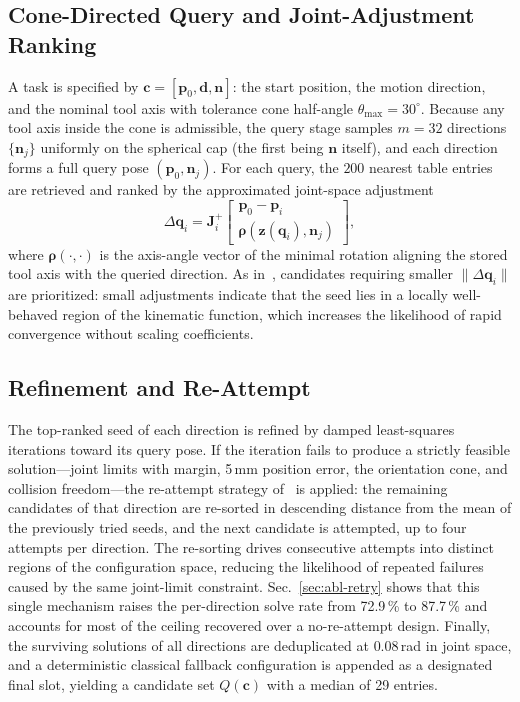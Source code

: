 \documentclass[journal]{IEEEtran}
\begin{document}
\subsection{Cone-Directed Query and Joint-Adjustment Ranking}
\label{sec:query}
A task is specified by $\mathbf{c}=[\mathbf{p}_0,\mathbf{d},\mathbf{n}]$:
the start position, the motion direction, and the nominal tool axis with
tolerance cone half-angle $\theta_{\max}{=}30^\circ$. Because any tool
axis inside the cone is admissible, the query stage samples $m{=}32$
directions $\{\mathbf{n}_j\}$ uniformly on the spherical cap (the first
being $\mathbf{n}$ itself), and each direction forms a full query pose
$(\mathbf{p}_0,\mathbf{n}_j)$. For each query, the $200$ nearest table
entries are retrieved and ranked by the approximated joint-space
adjustment
\begin{equation}
\Delta\mathbf{q}_i=\mathbf{J}^{+}_i\!
\begin{bmatrix}\mathbf{p}_0-\mathbf{p}_i\\[1pt]
\boldsymbol{\rho}(\mathbf{z}(\mathbf{q}_i),\mathbf{n}_j)\end{bmatrix},
\label{eq:rank}
\end{equation}
where $\boldsymbol{\rho}(\cdot,\cdot)$ is the axis-angle vector of the
minimal rotation aligning the stored tool axis with the queried
direction. As in~\cite{yuan2026iksel}, candidates requiring smaller
$\|\Delta\mathbf{q}_i\|$ are prioritized: small adjustments indicate that
the seed lies in a locally well-behaved region of the kinematic function,
which increases the likelihood of rapid convergence without scaling
coefficients.

\subsection{Refinement and Re-Attempt}
\label{sec:retry}
The top-ranked seed of each direction is refined by damped least-squares
iterations toward its query pose. If the iteration fails to produce a
strictly feasible solution---joint limits with margin, 5\,mm position
error, the orientation cone, and collision freedom---the re-attempt
strategy of~\cite{yuan2026iksel} is applied: the remaining candidates of
that direction are re-sorted in descending distance from the mean of the
previously tried seeds, and the next candidate is attempted, up to four
attempts per direction. The re-sorting drives consecutive attempts into
distinct regions of the configuration space, reducing the likelihood of
repeated failures caused by the same joint-limit constraint.
Sec.~\ref{sec:abl-retry} shows that this single mechanism raises the
per-direction solve rate from 72.9\,\% to 87.7\,\% and accounts for most
of the ceiling recovered over a no-re-attempt design. Finally, the
surviving solutions of all directions are deduplicated at $0.08$\,rad in
joint space, and a deterministic classical fallback configuration is
appended as a designated final slot, yielding a candidate set
$Q(\mathbf{c})$ with a median of 29 entries.
\end{document}
